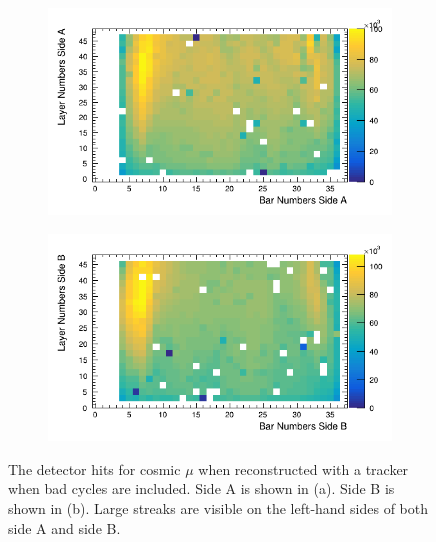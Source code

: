 \begin{figure}[!h]
\centering
\begin{subfigure}{.5\textwidth}
  \centering
  \includegraphics[width=\linewidth]{Chapter5/Figs/Raster/sideAHitsWithBadCycles.png}
  \captionsetup{width=.9\linewidth}
  \caption{} 
  \label{subFig:sideAHitsWithBadCycles}
\end{subfigure}%
\begin{subfigure}{.5\textwidth}
  \centering
\includegraphics[width=\linewidth]{Chapter5/Figs/Raster/sideBHitsWithBadCycles.png}
  \captionsetup{width=.9\linewidth}
  \caption{}
  \label{subFig:sideBHitsWithBadCycles}
\end{subfigure}
\caption{The detector hits for cosmic $\mu$ when reconstructed with a tracker when bad cycles are included. Side A is shown in (a). Side B is shown in (b). Large streaks are visible on the left-hand sides of both side A and side B.}
\label{fig:sideABHitsWithBadCycles}
\end{figure}

\clearpage
